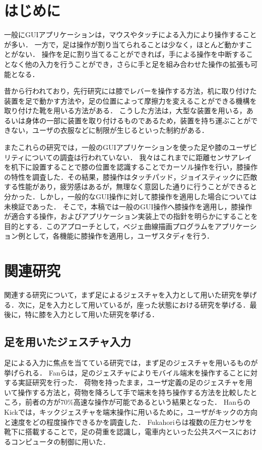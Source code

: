 \documentclass[submit, techrep]{ipsj}
\begin{document}
\section{はじめに}
一般にGUIアプリケーションは，マウスやタッチによる入力により操作することが多い．
一方で，足は操作が割り当てられることは少なく，ほとんど動かすことがない．
操作を足に割り当てることができれば，手による操作を中断することなく他の入力を行うことができ，さらに手と足を組み合わせた操作の拡張も可能となる．\par
昔から行われており，先行研究には膝でレバーを操作する方法\cite{1698228}，机に取り付けた装置を足で動かす方法\cite{Pearson:1986:MMD:22627.22392, Pearson:1988:EEP:57167.57169}や，足の位置によって摩擦力を変えることができる機構を取り付けた靴\cite{Horodniczy:2017:FHE:3025453.3025625}を用いる方法がある．
こうした方法は，大型な装置を用いる，あるいは身体の一部に装置を取り付けるものであるため，装置を持ち運ぶことができない，ユーザの衣服などに制限が生じるといった制約がある．\par
またこれらの研究では，一般のGUIアプリケーションを使った足や膝のユーザビリティについての調査は行われていない．
我々はこれまでに距離センサアレイを机下に設置することで膝の位置を認識することでカーソル操作を行い，膝操作の特性を調査した．その結果，膝操作はタッチパッド，ジョイスティックに匹敵する性能があり，疲労感はあるが，無理なく意図した通りに行うことができると分かった．しかし，一般的なGUI操作に対して膝操作を適用した場合については未検証であった．
そこで，本稿では一般のGUI操作へ膝操作を適用し，膝操作が適合する操作，およびアプリケーション実装上での指針を明らかにすることを目的とする．このアプローチとして，ベジェ曲線描画プログラムをアプリケーション例として，各機能に膝操作を適用し，ユーザスタディを行う．

\section{関連研究}
関連する研究について，まず足によるジェスチャを入力として用いた研究を挙げる．次に，足を入力として用いているが，座った状態における研究を挙げる．最後に，特に膝を入力として用いた研究を挙げる．
\subsection{足を用いたジェスチャ入力}
足による入力に焦点を当てている研究では，まず足のジェスチャを用いるものが挙げられる．
Fanら\cite{Fan:2017:ESF:3123021.3123043}は，足のジェスチャによりモバイル端末を操作することに対する実証研究を行った．
荷物を持ったまま，ユーザ定義の足のジェスチャを用いて操作する方法と，荷物を降ろして手で端末を持ち操作する方法を比較したところ，前者の方が70\%高速な操作が可能であるという結果となった．
HanらのKick\cite{Han:2011:KIU:2037373.2037379}では，キックジェスチャを端末操作に用いるために，ユーザがキックの方向と速度をどの程度操作できるかを調査した．
Fukahoriら\cite{Fukahori:2015:ESF:2702123.2702308}は複数の圧力センサを靴下に搭載することで，足の荷重を認識し，電車内といった公共スペースにおけるコンピュータの制御に用いた．\par
\end{document}
